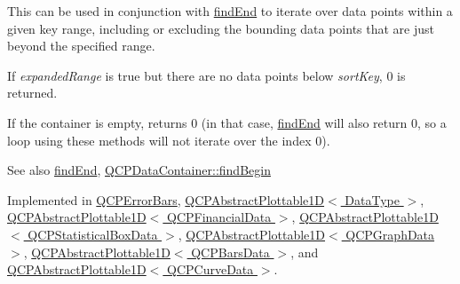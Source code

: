 This can be used in conjunction with \hyperlink{classQCPPlottableInterface1D_a5deced1016bc55a41a2339619045b295}{find\+End} to iterate over data points within a given key range, including or excluding the bounding data points that are just beyond the specified range.

If {\itshape expanded\+Range} is true but there are no data points below {\itshape sort\+Key}, 0 is returned.

If the container is empty, returns 0 (in that case, \hyperlink{classQCPPlottableInterface1D_a5deced1016bc55a41a2339619045b295}{find\+End} will also return 0, so a loop using these methods will not iterate over the index 0).

\begin{DoxySeeAlso}{See also}
\hyperlink{classQCPPlottableInterface1D_a5deced1016bc55a41a2339619045b295}{find\+End}, \hyperlink{classQCPDataContainer_a8ffcab551fd06dd037874ef644c73467}{Q\+C\+P\+Data\+Container\+::find\+Begin} 
\end{DoxySeeAlso}


Implemented in \hyperlink{classQCPErrorBars_a74c57d6abb8eda3c4c31b72d1df9f568}{Q\+C\+P\+Error\+Bars}, \hyperlink{classQCPAbstractPlottable1D_ad0b46d25cde3d035b180fb8f10c056e6}{Q\+C\+P\+Abstract\+Plottable1\+D$<$ Data\+Type $>$}, \hyperlink{classQCPAbstractPlottable1D_ad0b46d25cde3d035b180fb8f10c056e6}{Q\+C\+P\+Abstract\+Plottable1\+D$<$ Q\+C\+P\+Financial\+Data $>$}, \hyperlink{classQCPAbstractPlottable1D_ad0b46d25cde3d035b180fb8f10c056e6}{Q\+C\+P\+Abstract\+Plottable1\+D$<$ Q\+C\+P\+Statistical\+Box\+Data $>$}, \hyperlink{classQCPAbstractPlottable1D_ad0b46d25cde3d035b180fb8f10c056e6}{Q\+C\+P\+Abstract\+Plottable1\+D$<$ Q\+C\+P\+Graph\+Data $>$}, \hyperlink{classQCPAbstractPlottable1D_ad0b46d25cde3d035b180fb8f10c056e6}{Q\+C\+P\+Abstract\+Plottable1\+D$<$ Q\+C\+P\+Bars\+Data $>$}, and \hyperlink{classQCPAbstractPlottable1D_ad0b46d25cde3d035b180fb8f10c056e6}{Q\+C\+P\+Abstract\+Plottable1\+D$<$ Q\+C\+P\+Curve\+Data $>$}.

